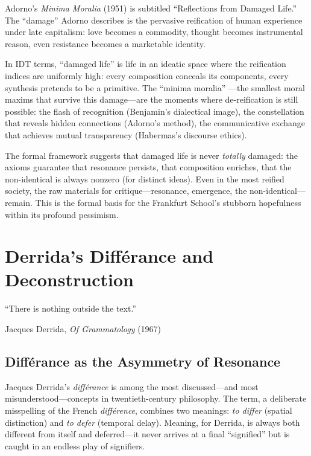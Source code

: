 \begin{remark}
Adorno's \textit{Minima Moralia} (1951) is subtitled ``Reflections from
Damaged Life.'' The ``damage'' Adorno describes is the pervasive reification
of human experience under late capitalism: love becomes a commodity, thought
becomes instrumental reason, even resistance becomes a marketable identity.

In IDT terms, ``damaged life'' is life in an ideatic space where the
reification indices are uniformly high: every composition conceals its
components, every synthesis pretends to be a primitive. The ``minima moralia''
---the smallest moral maxims that survive this damage---are the moments where
de-reification is still possible: the flash of recognition (Benjamin's
dialectical image), the constellation that reveals hidden connections (Adorno's
method), the communicative exchange that achieves mutual transparency (Habermas's
discourse ethics).

The formal framework suggests that damaged life is never \emph{totally}
damaged: the axioms guarantee that resonance persists, that composition
enriches, that the non-identical is always nonzero (for distinct ideas).
Even in the most reified society, the raw materials for critique---resonance,
emergence, the non-identical---remain. This is the formal basis for the
Frankfurt School's stubborn hopefulness within its profound pessimism.
\end{remark}



\chapter{Derrida's Diff\'erance and Deconstruction}
\label{ch:derrida}

\epigraph{``There is nothing outside the text.''}{Jacques Derrida, \textit{Of Grammatology} (1967)}

\section{Diff\'erance as the Asymmetry of Resonance}

Jacques Derrida's \textit{diff\'erance} is among the most discussed---and most
misunderstood---concepts in twentieth-century philosophy. The term, a deliberate
misspelling of the French \textit{diff\'erence}, combines two meanings:
\emph{to differ} (spatial distinction) and \emph{to defer} (temporal delay).
Meaning, for Derrida, is always both different from itself and deferred---it
never arrives at a final ``signified'' but is caught in an endless play of
signifiers.

